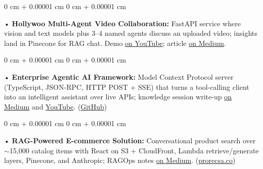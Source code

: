\documentclass[10pt, letterpaper]{article}
\newenvironment{onecolentry}{
    \begin{adjustwidth}{
        0 cm + 0.00001 cm
    }{
        0 cm + 0.00001 cm
    }
}{
    \end{adjustwidth}
} %
\begin{document}
\begin{onecolentry}
     • \textbf{Hollywoo Multi-Agent Video Collaboration:} FastAPI service where vision and text models plus 3--4 named agents discuss an uploaded video; insights land in Pinecone for RAG chat. Demo \href{https://www.youtube.com/watch?v=KBs_3V0OAgU}{on YouTube}; article \href{https://medium.com/@sreenikethaathreya/hollywoo-ai-video-analysis-5eae37ca7e16}{on Medium}.
\end{onecolentry}
\begin{onecolentry}
     • \textbf{Enterprise Agentic AI Framework:} Model Context Protocol server (TypeScript, JSON-RPC, HTTP POST + SSE) that turns a tool-calling client into an intelligent assistant over live APIs; knowledge session write-up \href{https://medium.com/@sreenikethaathreya/get-good-at-using-ai-noob-5d2576203112}{on Medium} and \href{https://www.youtube.com/watch?v=op2gTYyFb5U}{YouTube}. (\href{https://github.com/daedalus-s/dota2-mcp-server}{GitHub})
\end{onecolentry}
\begin{onecolentry}
     • \textbf{RAG-Powered E-commerce Solution:} Conversational product search over $\sim$15,000 catalog items with React on S3 + CloudFront, Lambda retrieve/generate layers, Pinecone, and Anthropic; RAGOps notes \href{https://medium.com/@sreenikethaathreya/from-rags-to-riches-bba8a671d5e6}{on Medium}. (\href{https://prorecsa.co}{prorecsa.co})
\end{onecolentry}
\vspace{2 pt}
        \vspace{2 pt }
\end{document}
